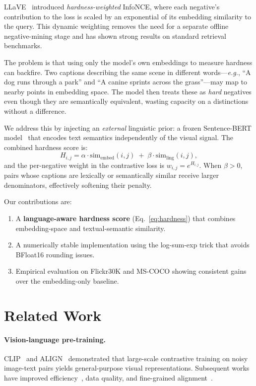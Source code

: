 \documentclass[10pt,twocolumn,letterpaper]{article}
\begin{document}
LLaVE~\cite{llave} introduced \emph{hardness-weighted} InfoNCE, where each negative's contribution to the loss is scaled by an exponential of its embedding similarity to the query.
This dynamic weighting removes the need for a separate offline negative-mining stage and has shown strong results on standard retrieval benchmarks.

The problem is that using only the model's own embeddings to measure hardness can backfire.
Two captions describing the same scene in different words—\textit{e.g.}, ``A dog runs through a park'' and ``A canine sprints across the grass''—may map to nearby points in embedding space.
The model then treats these as \emph{hard} negatives even though they are semantically equivalent, wasting capacity on a distinctions without a difference.

We address this by injecting an \emph{external} linguistic prior: a frozen Sentence-BERT model~\cite{sbert} that encodes text semantics independently of the visual signal.
The combined hardness score is:
\begin{equation}
  H_{i,j} = \alpha \cdot \mathrm{sim}_\mathrm{embed}(i,j) \;+\; \beta \cdot \mathrm{sim}_\mathrm{ling}(i,j),
  \label{eq:hardness}
\end{equation}
and the per-negative weight in the contrastive loss is $w_{i,j} = e^{H_{i,j}}$.
When $\beta{>}0$, pairs whose captions are lexically or semantically similar receive larger denominators, effectively softening their penalty.

Our contributions are:
\begin{enumerate}
  \item A \textbf{language-aware hardness score} (Eq.~\ref{eq:hardness}) that combines embedding-space and textual-semantic similarity.
  \item A numerically stable implementation using the log-sum-exp trick that avoids BFloat16 rounding issues.
  \item Empirical evaluation on Flickr30K and MS-COCO showing consistent gains over the embedding-only baseline.
\end{enumerate}

\section{Related Work}

\paragraph{Vision-language pre-training.}
CLIP~\cite{clip} and ALIGN~\cite{align} demonstrated that large-scale contrastive training on noisy image-text pairs yields general-purpose visual representations.
Subsequent works have improved efficiency~\cite{cyclip,declip}, data quality, and fine-grained alignment~\cite{filip}.
\end{document}
